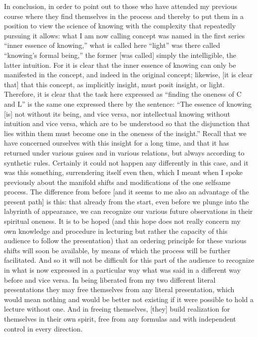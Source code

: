 In conclusion, in order to point out to those
who have attended my previous course
where they find themselves in the process
and thereby to put them in a position
to view the science of knowing with
the complexity that repeatedly pursuing it allows:
what I am now calling concept was named
in the first series “inner essence of knowing,”
what is called here “light”
was there called “knowing's formal being,”
the former [was called] simply the intelligible,
the latter intuition.
For it is clear that the inner essence of knowing
can only be manifested in the concept,
and indeed in the original concept;
likewise, [it is clear that] that this concept,
as implicitly insight, must posit insight, or light.
Therefore, it is clear that the task here expressed as
“finding the oneness of C and L” is
the same one expressed there by the sentence:
“The essence of knowing [is] not without its being, and vice versa,
nor intellectual knowing without intuition and vice versa,
which are to be understood so that the disjunction
that lies within them must become one
in the oneness of the insight.”
Recall that we have concerned ourselves with this
insight for a long time,
and that it has returned under various guises
and in various relations, but always according to synthetic rules.
Certainly it could not happen any differently in this case,
and it was this something, surrendering itself even then,
which I meant when I spoke previously about the manifold shifts
and modifications of the one selfsame process.
The difference from before
[and it seems to me also an advantage of the present path]
is this:
that already from the start,
even before we plunge
into the labyrinth of appearance,
we can recognize our various future observations
in their spiritual oneness.
It is to be hoped
(and this hope does not really concern
my own knowledge and procedure in lecturing
but rather the capacity of this audience
to follow the presentation)
that an ordering principle for these various shifts
will soon be available,
by means of which the process will be further facilitated.
And so it will not be difficult for this part of the audience
to recognize in what is now expressed in a particular way
what was said in a different way before and vice versa.
In being liberated from my two different literal presentations
they may free themselves from any literal presentation,
which would mean nothing and would be better not existing
if it were possible to hold a lecture without one.
And in freeing themselves,
[they] build realization for themselves in their own spirit,
free from any formulas and with independent control in every direction.

